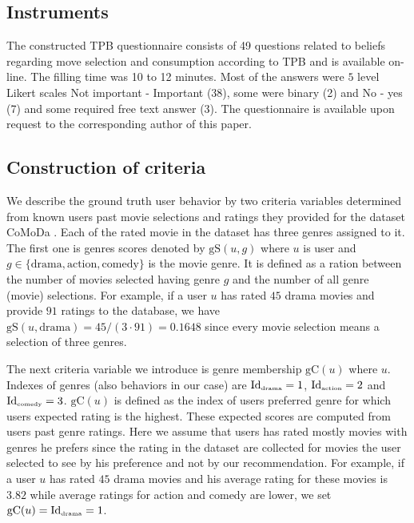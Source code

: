 \documentclass{llncs}
\def\gS{{\mbox{gS}}}
\def\gC{{\mbox{gC}}}
\def\Id{{\mbox{Id}}}
\begin{document}
\subsection{Instruments}\label{SubSec_Instrum}

The constructed TPB questionnaire consists of 49 questions related to beliefs regarding move selection and consumption according to TPB and is available on-line. The filling time was 10 to 12 minutes. Most of the answers were $5$ level Likert scales Not important - Important (38), some were binary (2) and No - yes (7) and some required free text answer (3). The questionnaire is available upon request to the corresponding author of this paper. 


\subsection{Construction of criteria}\label{SubSec_CritConstr}

We describe the ground truth user behavior by two criteria variables determined from known users past movie selections and ratings they provided for the dataset CoMoDa \cite{CoMoDa2009}. Each of the rated movie in the dataset has three genres assigned to it.  The first one is genres scores denoted by $\gS(u, g)$ where $u$ is user and $g\in\{\mbox{drama}, \mbox{action}, \mbox{comedy}\}$ is the movie genre. It is defined as a ration between the number of movies selected having genre $g$ and the number of all genre (movie) selections. For example, if a user $u$ has rated $45$ drama movies and provide $91$ ratings to the database, we have $\gS(u, \mbox{drama}) = 45/(3\cdot91)=0.1648$ since every movie selection means a selection of three genres. 

The next criteria variable we introduce is genre membership $\gC(u)$ where $u$. Indexes of genres (also behaviors in our case) are $\Id_{\mbox{\tiny drama}}=1$, $\Id_{\mbox{\tiny action}}=2$ and $\Id_{\mbox{\tiny comedy}}=3$. $\gC(u)$ is defined as the index of users preferred genre for which users expected rating is the highest. These expected scores are computed from users past genre ratings. Here we assume that users has rated mostly movies with genres he prefers since the rating in the dataset are collected for movies the user selected to see by his preference and not by our recommendation. For example, if a user $u$ has rated $45$ drama movies and his average rating for these movies is $3.82$ while average ratings for action and comedy are lower, we set $\gC(u)=\Id_{\mbox{\tiny drama}}=1$.
 
\end{document}
